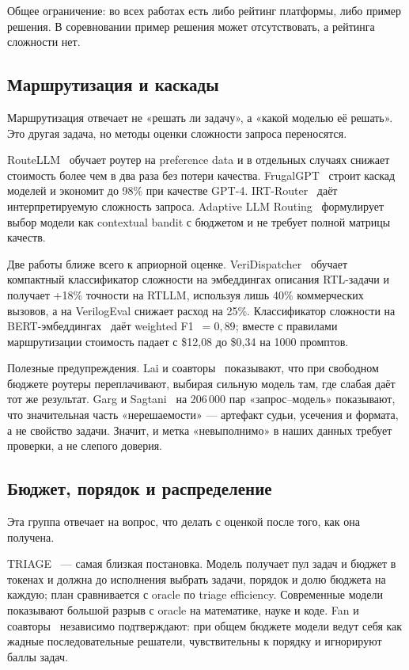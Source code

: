 \documentclass[11pt,a4paper]{article}
\begin{document}
Общее ограничение: во всех работах есть либо рейтинг платформы, либо пример
решения. В соревновании пример решения может отсутствовать, а рейтинга
сложности нет.

\subsection{Маршрутизация и каскады}

Маршрутизация отвечает не «решать ли задачу», а «какой моделью её решать».
Это другая задача, но методы оценки сложности запроса переносятся.

RouteLLM~\cite{ong2024routellm} обучает роутер на preference data и в отдельных
случаях снижает стоимость более чем в два раза без потери
качества. FrugalGPT~\cite{chen2023frugalgpt}
строит каскад моделей и экономит до 98\% при качестве GPT-4.
IRT-Router~\cite{song2025irtrouter} даёт интерпретируемую сложность запроса.
Adaptive LLM Routing~\cite{panda2025adaptive} формулирует выбор модели как
contextual bandit с бюджетом и не требует полной матрицы качеств.

Две работы ближе всего к априорной оценке. VeriDispatcher~\cite{wang2025veridispatcher}
обучает компактный классификатор сложности на эмбеддингах описания RTL-задачи
и получает +18\% точности на RTLLM, используя лишь 40\% коммерческих вызовов,
а на VerilogEval снижает расход на 25\%. Классификатор сложности на
BERT-эмбеддингах~\cite{harshith2025cost} даёт weighted F1~$=0{,}89$; вместе с
правилами маршрутизации стоимость падает с \$12{,}08 до \$0{,}34 на 1000
промптов.

Полезные предупреждения. Lai и соавторы~\cite{lai2026overpay} показывают, что
при свободном бюджете роутеры переплачивают, выбирая сильную модель там, где
слабая даёт тот же результат. Garg и Sagtani~\cite{garg2026unsolvability} на
206\,000 пар «запрос--модель» показывают, что значительная часть «нерешаемости»
— артефакт судьи, усечения и формата, а не свойство задачи. Значит, и метка
«невыполнимо» в наших данных требует проверки, а не слепого доверия.

\subsection{Бюджет, порядок и распределение}

Эта группа отвечает на вопрос, что делать с оценкой после того, как она
получена.

TRIAGE~\cite{nazi2026triage} — самая близкая постановка. Модель получает пул
задач и бюджет в токенах и должна до исполнения выбрать задачи, порядок и
долю бюджета на каждую; план сравнивается с oracle по triage efficiency.
Современные модели показывают большой разрыв с oracle на математике, науке и
коде. Fan и соавторы~\cite{fan2026thinking} независимо подтверждают: при
общем бюджете модели ведут себя как жадные последовательные решатели,
чувствительны к порядку и игнорируют баллы задач.
\end{document}
